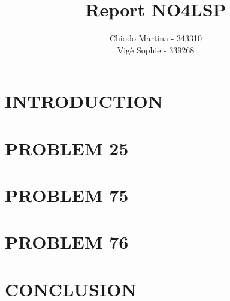 \documentclass{article}
\title{Report NO4LSP}
\author{Chiodo Martina - 343310 \\ Vigè Sophie - 339268}
\date{}
\begin{document}
%



\section*{INTRODUCTION}


\clearpage
\section*{PROBLEM 25}


\clearpage
\section*{PROBLEM 75}


\clearpage
\section*{PROBLEM 76}


\clearpage
\section*{CONCLUSION}

\end{document}
